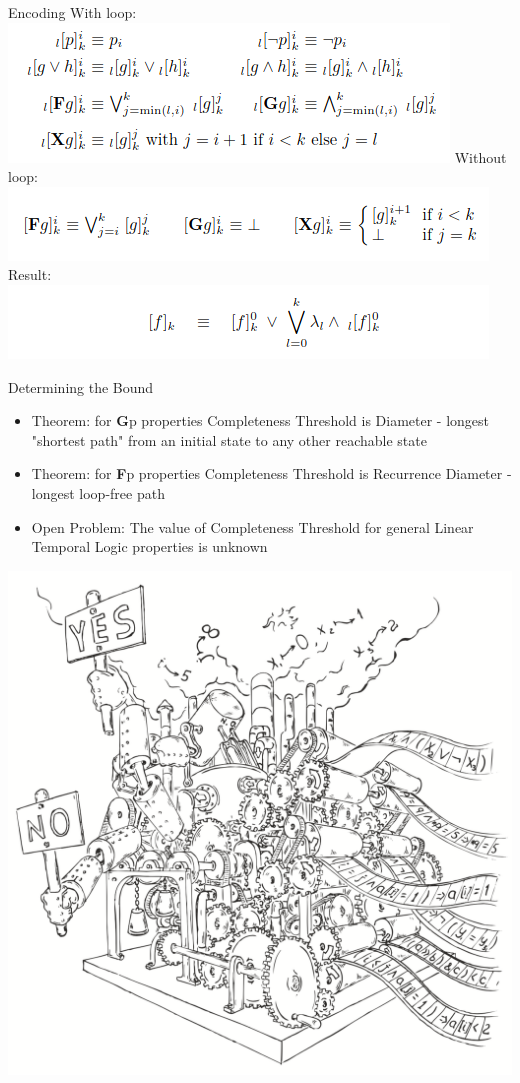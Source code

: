\documentclass{beamer}
\begin{document}
\begin{frame}{Encoding}
With loop:\newline
\includegraphics[scale=0.5]{not_loop.png}\newline
Without loop:\newline
\includegraphics[scale=0.5]{loop.png}\newline
Result:\newline
\includegraphics[scale=0.5]{result.png}
\end{frame}

\begin{frame}{Determining the Bound}
\begin{itemize}
\item Theorem: for \textbf{G}p properties Completeness Threshold is Diameter - longest "shortest path" from an initial state to any other reachable state
\item Theorem: for \textbf{F}p properties Completeness Threshold is Recurrence Diameter - longest loop-free path
\item Open Problem: The value of Completeness Threshold for general Linear Temporal Logic properties is unknown
\end{itemize}
\end{frame}

\begin{frame}
\includegraphics[scale=0.5]{../decision-procedure.png}
\end{frame}
\end{document}
